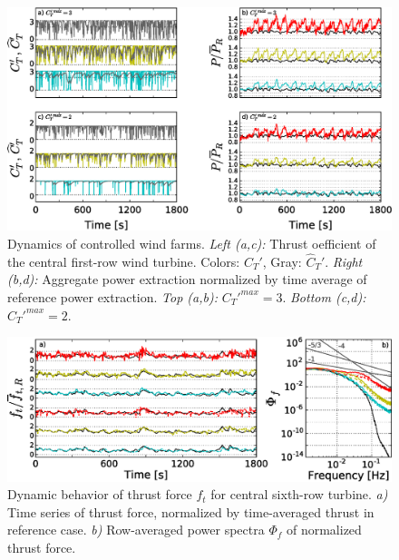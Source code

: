 \begin{figure}[t]
	\centering
	\includegraphics[width=\linewidth]{chapters/philtrans_torque/dynamics.eps}
	\caption[Dynamics of controlled wind farms.]{Dynamics of controlled wind farms. 
		\emph{Left (a,c): } Thrust oefficient of the central first-row wind turbine. Colors: $C_T'$, Gray: $\widehat{C}_T'$. \emph{Right (b,d): } Aggregate power extraction normalized by time average of reference power extraction. \emph{Top (a,b): } $C_T'^{max}=3$. \emph{Bottom (c,d): } $C_T'^{max} = 2$. \legendtauref \label{fig:time_control_and_time_power}}
\end{figure}

\begin{figure}[b!]
	\includegraphics[width=\textwidth]{chapters/philtrans_torque/thrust_forces.eps}
	\caption[Dynamic behavior of thrust force $f_t$ for central sixth-row turbine.]{Dynamic behavior of thrust force $f_t$ for central sixth-row turbine. \emph{a)} Time series of thrust force, normalized by time-averaged thrust in reference case. \emph{b) } Row-averaged power spectra $\Phi_f$ of normalized thrust force. \quad \ \ \legend \label{fig:thrust}}
\end{figure}

